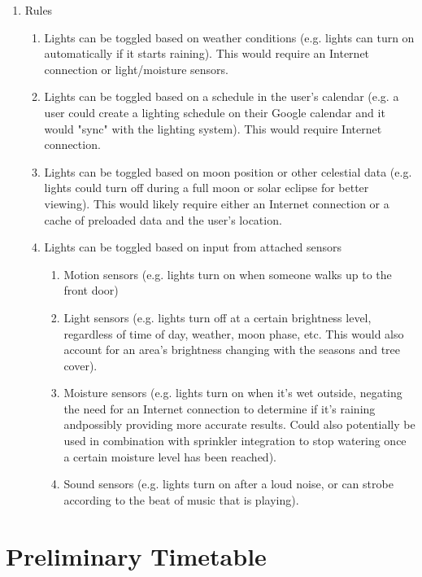 \documentclass[12pt]{article}
\begin{document}
\begin{enumerate}[resume]
\begin{enumerate}
\begin{enumerate}
                \end{enumerate}
        \end{enumerate}
    \item Rules
        \begin{enumerate}
            \item Lights can be toggled based on weather conditions (e.g. lights can turn on automatically if it starts raining).  This would require an Internet connection or light/moisture sensors.
            \item Lights can be toggled based on a schedule in the user's calendar (e.g. a user could create a lighting schedule on their Google calendar and it would "sync" with the lighting system).  This would require Internet connection.
            \item Lights can be toggled based on moon position or other celestial data (e.g. lights could turn off during a full moon or solar eclipse for better viewing).  This would likely require either an Internet connection or a cache of preloaded data and the user's location.
            \item Lights can be toggled based on input from attached sensors
                \begin{enumerate}
                    \item Motion sensors (e.g. lights turn on when someone walks up to the front door)
                    \item Light sensors (e.g. lights turn off at a certain brightness level, regardless of time of day, weather, moon phase, etc.  This would also account for an area's brightness changing with the seasons and tree cover).
                    \item Moisture sensors (e.g. lights turn on when it's wet outside, negating the need for an Internet connection to determine if it's raining andpossibly providing more accurate results.  Could also potentially be used in combination with sprinkler integration to stop watering once a certain moisture level has been reached).
                    \item Sound sensors (e.g. lights turn on after a loud noise, or can strobe according to the beat of music that is playing).
                \end{enumerate}
        \end{enumerate}
\end{enumerate}

\section{Preliminary Timetable}
\end{document}
